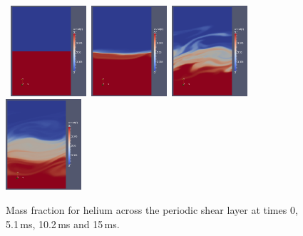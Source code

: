 \clearpage

\begin{figure}[htbp]
\begin{center}
\mbox{
\includegraphics[width=0.25\textwidth]{../2D/periodic-shear-layer/psl-massf0-t00.png}
\includegraphics[width=0.25\textwidth]{../2D/periodic-shear-layer/psl-massf0-t05.png}
\includegraphics[width=0.25\textwidth]{../2D/periodic-shear-layer/psl-massf0-t10.png}
\includegraphics[width=0.25\textwidth]{../2D/periodic-shear-layer/psl-massf0-t15.png}
}
\end{center}
\caption{Mass fraction for helium across the periodic shear layer at times 0, 5.1\,ms, 10.2\,ms and 15\,ms.}
\label{psl-mass-fraction-fig}
\end{figure}

